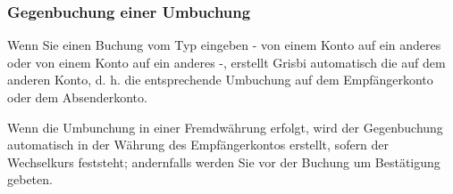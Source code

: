 \subsubsection{Gegenbuchung einer Umbuchung\label{transactions-new-transfer-associatedOperation}}

Wenn Sie einen Buchung vom Typ  eingeben - von einem Konto auf ein anderes oder von einem Konto auf ein anderes -, erstellt Grisbi automatisch die  auf dem anderen Konto, d. h. die entsprechende Umbuchung auf dem Empfängerkonto oder dem Absenderkonto.

Wenn die Umbunchung in einer Fremdwährung erfolgt, wird der Gegenbuchung automatisch in der Währung des Empfängerkontos erstellt, sofern der Wechselkurs feststeht; andernfalls werden Sie vor der Buchung um Bestätigung gebeten.

